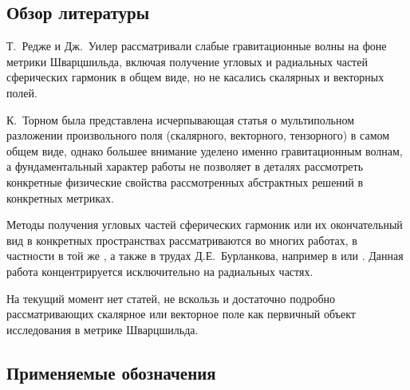 \documentclass[\docroot/reports/draft/report.tex]{subfiles}
\begin{document}
\subsection{Обзор литературы}

Т.~Редже и Дж.~Уилер \cite{regge_wheeler_1957} рассматривали слабые гравитационные волны на фоне метрики Шварцшильда, включая получение угловых и радиальных частей сферических гармоник в общем виде, но не касались скалярных и векторных полей.

К.~Торном \cite{thorne_multipole} была представлена исчерпывающая статья о мультипольном разложении произвольного поля (скалярного, векторного, тензорного) в самом общем виде, однако большее внимание уделено именно гравитационным волнам, а фундаментальный характер работы не позволяет в деталях рассмотреть конкретные физические свойства рассмотренных абстрактных решений в конкретных метриках.

Методы получения угловых частей сферических гармоник или их окончательный вид в конкретных пространствах рассматриваются во многих работах, в частности в той же \cite{thorne_multipole}, а также в трудах Д.Е.~Бурланкова, например в \cite{burlankov_space_dynamics} или \cite{BurVas2019}. Данная работа концентрируется исключительно на радиальных частях.

На текущий момент нет статей, не вскользь и достаточно подробно рассматривающих скалярное или векторное поле как первичный объект исследования в метрике Шварцшильда.

\subsection{Применяемые обозначения}\label{seq:notation}


\end{document}
